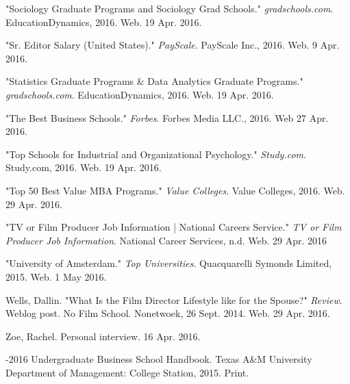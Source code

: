 \begin{workscited}
\begin{flushleft}
\bibent
"Sociology Graduate Programs and Sociology Grad Schools." \textit{gradschools.com}. 				EducationDynamics, 2016. Web. 19 Apr. 2016. 

\bibent
"Sr. Editor Salary (United States)." \textit{PayScale}. PayScale Inc., 2016. Web. 9 Apr. 2016.

\bibent
"Statistics Graduate Programs \& Data Analytics Graduate Programs." \textit{gradschools.com}. 			EducationDynamics, 2016. Web. 19 Apr. 2016. 

\bibent
"The Best Business Schools." \textit{Forbes}. Forbes Media LLC., 2016. Web 27 Apr. 2016.

\bibent
"Top Schools for Industrial and Organizational Psychology." \textit{Study.com}. Study.com, 		
2016. Web. 19 Apr. 2016.  

\bibent
"Top 50 Best Value MBA Programs." \textit{Value Colleges}. Value Colleges, 2016. Web. 29 Apr. 2016.

\bibent
"TV or Film Producer Job Information | National Careers Service." \textit{TV or Film Producer Job 
Information}. National Career Services, n.d. Web. 29 Apr. 2016

\bibent
"University of Amsterdam." \textit{Top Universities}. Quacquarelli Symonds Limited, 2015. Web. 1 
May 2016.

\bibent
Wells, Dallin. "What Is the Film Director Lifestyle like for the Spouse?" \textit{Review}. Weblog post. 
No Film School. Nonetwoek, 26 Sept. 2014. Web. 29 Apr. 2016.

\bibent
Zoe, Rachel. Personal interview. 16 Apr. 2016.

-2016 Undergraduate Business School Handbook. Texas A\&M University Department of Management: College Station, 2015. Print.

\end{flushleft}
\end{workscited} 